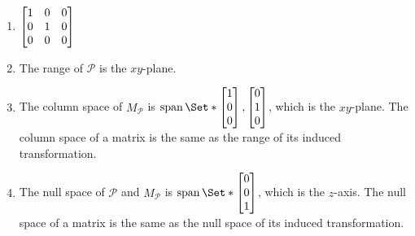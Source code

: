 \begin{exercises}
\begin{problist}
		\begin{solution}
			\begin{enumerate}
				\item $\mat{1&0&0\\0&1&0\\0&0&0}$

				\item The range of $\mathcal{P}$ is the $xy$-plane.

				\item The column space of $M_{\mathcal{P}}$ is $\Span\Set*{\mat{1\\0\\0},\mat{0\\1\\0}}$,
					which is the $xy$-plane. The column space of a matrix is the
					same as the range of its induced transformation.

				\item The null space of $\mathcal{P}$ and $M_{\mathcal{P}}$ is $\Span
					\Set*{\mat{0\\0\\1}}$, which is the $z$-axis. The null space
					of a matrix is the same as the null space of its induced transformation.
			\end{enumerate}
		\end{solution}
	\end{problist}
\end{exercises}